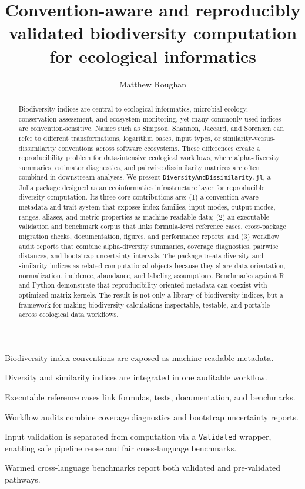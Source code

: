 \documentclass[preprint,12pt,authoryear]{elsarticle}
\begin{document}
\begin{frontmatter}

\title{Convention-aware and reproducibly validated biodiversity computation for ecological informatics}

\author[inst1]{Matthew Roughan}

\begin{abstract}
Biodiversity indices are central to ecological informatics, microbial ecology,
conservation assessment, and ecosystem monitoring, yet many commonly used
indices are convention-sensitive.  Names such as Simpson, Shannon, Jaccard,
and Sorensen can refer to different transformations, logarithm bases, input
types, or similarity-versus-dissimilarity conventions across software
ecosystems.  These differences create a reproducibility problem for
data-intensive ecological workflows, where alpha-diversity summaries,
estimator diagnostics, and pairwise dissimilarity matrices are often combined
in downstream analyses.  We present \texttt{DiversityAndDissimilarity.jl}, a Julia
package designed as an ecoinformatics infrastructure layer for reproducible
diversity computation.  Its three core contributions are: (1) a
convention-aware metadata and trait system that exposes index families, input
modes, output modes, ranges, aliases, and metric properties as machine-readable
data; (2) an executable validation and benchmark corpus that links
formula-level reference cases, cross-package migration checks, documentation,
figures, and performance reports; and (3) workflow audit reports that combine
alpha-diversity summaries, coverage diagnostics, pairwise distances, and
bootstrap uncertainty intervals.  The package treats diversity and
similarity indices as related computational objects because they share data
orientation, normalization, incidence, abundance, and labeling assumptions.
Benchmarks against R and Python demonstrate that reproducibility-oriented
metadata can coexist with optimized matrix kernels.  The result is not only a
library of biodiversity indices, but a framework for making biodiversity
calculations inspectable, testable, and portable across ecological data
workflows.
\end{abstract}

\begin{highlights}
\item Biodiversity index conventions are exposed as machine-readable metadata.
\item Diversity and similarity indices are integrated in one auditable workflow.
\item Executable reference cases link formulas, tests, documentation, and benchmarks.
\item Workflow audits combine coverage diagnostics and bootstrap uncertainty reports.
\item Input validation is separated from computation via a \texttt{Validated} wrapper, enabling safe pipeline reuse and fair cross-language benchmarks.
\item Warmed cross-language benchmarks report both validated and pre-validated pathways.
\end{highlights}


\end{frontmatter}
\end{document}
